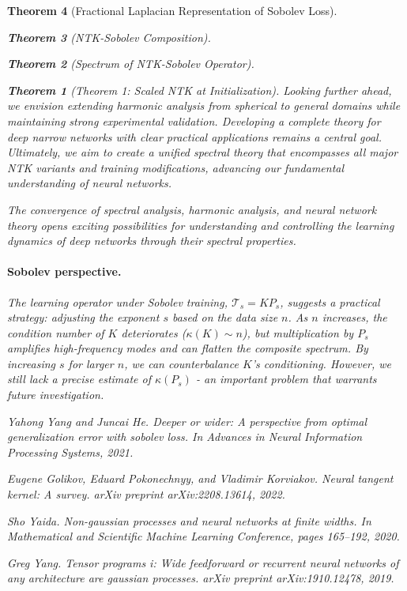 \documentclass{article}
\newtheorem{theorem}{Theorem}[section]
\begin{document}
\begin{theorem}[Fractional Laplacian Representation of Sobolev Loss]
\begin{theorem}[NTK-Sobolev Composition]
\begin{theorem}[Spectrum of NTK-Sobolev Operator]
\begin{theorem}[Theorem 1: Scaled NTK at Initialization]
Looking further ahead, we envision extending harmonic analysis from spherical to general domains while maintaining strong experimental validation. Developing a complete theory for deep narrow networks with clear practical applications remains a central goal. Ultimately, we aim to create a unified spectral theory that encompasses all major NTK variants and training modifications, advancing our fundamental understanding of neural networks.

The convergence of spectral analysis, harmonic analysis, and neural network theory opens exciting possibilities for understanding and controlling the learning dynamics of deep networks through their spectral properties.

\paragraph{Sobolev perspective.} The learning operator under Sobolev training, $\mathcal T_s = KP_s$, suggests a practical strategy: adjusting the exponent $s$ based on the data size $n$. As $n$ increases, the condition number of $K$ deteriorates ($\kappa(K)\sim n$), but multiplication by $P_s$ amplifies high-frequency modes and can flatten the composite spectrum. By increasing $s$ for larger $n$, we can counterbalance $K$'s conditioning. However, we still lack a precise estimate of $\kappa(P_s)$ - an important problem that warrants future investigation.

\newpage


\begin{thebibliography}{10}

Yahong Yang and Juncai He.
\newblock Deeper or wider: A perspective from optimal generalization error with sobolev loss.
\newblock In \emph{Advances in Neural Information Processing Systems}, 2021.

Eugene Golikov, Eduard Pokonechnyy, and Vladimir Korviakov.
\newblock Neural tangent kernel: A survey.
\newblock \emph{arXiv preprint arXiv:2208.13614}, 2022.

Sho Yaida.
\newblock Non-gaussian processes and neural networks at finite widths.
\newblock In \emph{Mathematical and Scientific Machine Learning Conference}, pages 165--192, 2020.

Greg Yang.
\newblock Tensor programs i: Wide feedforward or recurrent neural networks of any architecture are gaussian processes.
\newblock \emph{arXiv preprint arXiv:1910.12478}, 2019.


\end{thebibliography}
\end{theorem}
\end{theorem}
\end{theorem}
\end{theorem}
\end{document}
